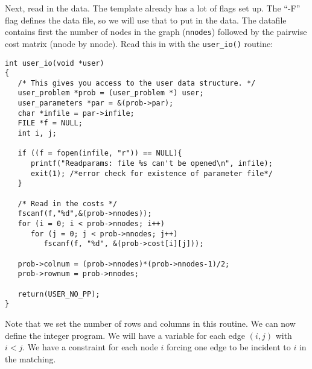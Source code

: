 \documentclass[11pt]{article}
\begin{document}
Next, read in the data. The template already has a lot of flags set up. The
``-F'' flag defines the data file, so we will use that to put in the data. The
datafile contains first the number of nodes in the graph (\texttt{nnodes})
followed by the pairwise cost matrix (nnode by nnode). Read this in with the
\texttt{user\_io()} routine:

\begin{verbatim}
int user_io(void *user)
{
   /* This gives you access to the user data structure. */
   user_problem *prob = (user_problem *) user;
   user_parameters *par = &(prob->par);
   char *infile = par->infile;
   FILE *f = NULL;
   int i, j;

   if ((f = fopen(infile, "r")) == NULL){
      printf("Readparams: file %s can't be opened\n", infile);
      exit(1); /*error check for existence of parameter file*/
   }

   /* Read in the costs */
   fscanf(f,"%d",&(prob->nnodes));
   for (i = 0; i < prob->nnodes; i++)
      for (j = 0; j < prob->nnodes; j++)
         fscanf(f, "%d", &(prob->cost[i][j]));
   
   prob->colnum = (prob->nnodes)*(prob->nnodes-1)/2;
   prob->rownum = prob->nnodes;

   return(USER_NO_PP);
}
\end{verbatim}   

Note that we set the number of rows and columns in this routine. We can now
define the integer program. We will have a variable for each edge $(i,j)$ with
$i<j$. We have a constraint for each node $i$ forcing one edge to be incident
to $i$ in the matching.
\end{document}
